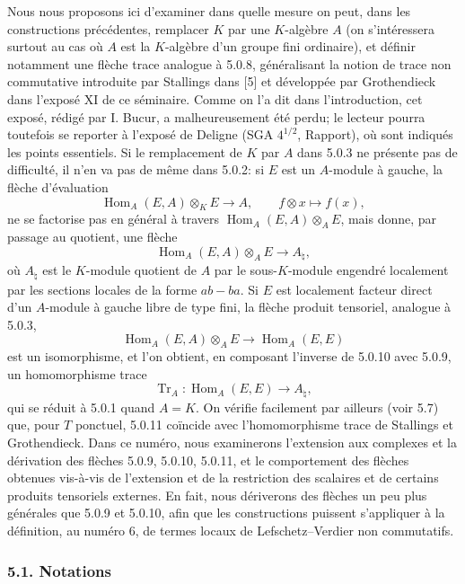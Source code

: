 \documentclass[11pt]{article}
\DeclareMathOperator{\Hom}{Hom}
\providecommand{\Tr}{\operatorname{Tr}}
\providecommand{\Tr}{\operatorname{Tr}}
\providecommand{\Tr}{\operatorname{Tr}}
\providecommand{\Hom}{\operatorname{Hom}}
\providecommand{\Tr}{\operatorname{Tr}}
\providecommand{\Hom}{\operatorname{Hom}}
\providecommand{\Tr}{\operatorname{Tr}}
\begin{document}
Nous nous proposons ici d'examiner dans quelle mesure on peut, dans les constructions précédentes, remplacer $K$ par une $K$-algèbre $A$ (on s'intéressera surtout au cas où $A$ est la $K$-algèbre d'un groupe fini ordinaire), et définir notamment une flèche trace analogue à 5.0.8, généralisant la notion de trace non commutative introduite par Stallings dans [5] et développée par Grothendieck dans l'exposé XI de ce séminaire. Comme on l'a dit dans l'introduction, cet exposé, rédigé par I. Bucur, a malheureusement été perdu; le lecteur pourra toutefois se reporter à l'exposé de Deligne (SGA $4^{1/2}$, Rapport), où sont indiqués les points essentiels. Si le remplacement de $K$ par $A$ dans 5.0.3 ne présente pas de difficulté, il n'en va pas de même dans 5.0.2: si $E$ est un $A$-module à gauche, la flèche d'évaluation
\[
\Hom_A(E,A)\otimes_KE\longrightarrow A,
\qquad f\otimes x\longmapsto f(x),
\]
ne se factorise pas en général à travers $\Hom_A(E,A)\otimes_AE$, mais donne, par passage au quotient, une flèche
\begin{equation}\tag{5.0.9}
\Hom_A(E,A)\otimes_AE\longrightarrow A_\natural,
\end{equation}
où $A_\natural$ est le $K$-module quotient de $A$ par le sous-$K$-module engendré localement par les sections locales de la forme $ab-ba$. Si $E$ est localement facteur direct d'un $A$-module à gauche libre de type fini, la flèche produit tensoriel, analogue à 5.0.3,
\begin{equation}\tag{5.0.10}
\Hom_A(E,A)\otimes_AE\longrightarrow\Hom_A(E,E)
\end{equation}
est un isomorphisme, et l'on obtient, en composant l'inverse de 5.0.10 avec 5.0.9, un homomorphisme trace
\begin{equation}\tag{5.0.11}
\Tr_A:\Hom_A(E,E)\longrightarrow A_\natural,
\end{equation}
qui se réduit à 5.0.1 quand $A=K$. On vérifie facilement par ailleurs (voir 5.7) que, pour $T$ ponctuel, 5.0.11 coïncide avec l'homomorphisme trace de Stallings et Grothendieck. Dans ce numéro, nous examinerons l'extension aux complexes et la dérivation des flèches 5.0.9, 5.0.10, 5.0.11, et le comportement des flèches obtenues vis-à-vis de l'extension et de la restriction des scalaires et de certains produits tensoriels externes. En fait, nous dériverons des flèches un peu plus générales que 5.0.9 et 5.0.10, afin que les constructions puissent s'appliquer à la définition, au numéro 6, de termes locaux de Lefschetz--Verdier non commutatifs.

\subsubsection*{5.1. Notations}
\end{document}

